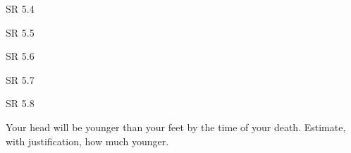 \documentclass[minion]{homework}
\begin{document}
\begin{aproblems}

\hproblem SR 5.4


\hproblem SR 5.5

\hproblem SR 5.6

\hproblem SR 5.7

\hproblem SR 5.8

 Your head will be younger than your feet by the time of your death.  Estimate, with justification, how much younger.

\end{aproblems}
\end{document}
